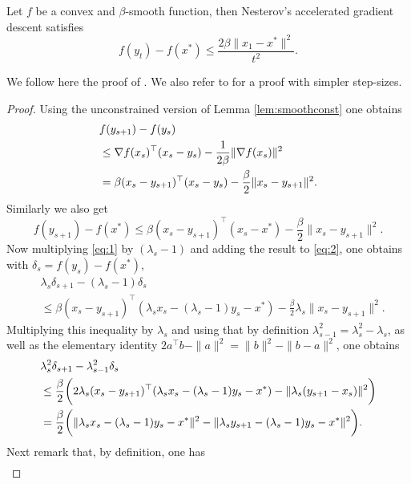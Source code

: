 \documentclass[openany]{now}
\begin{document}
\begin{theorem}
Let $f$ be a convex and $\beta$-smooth function, then Nesterov's accelerated gradient descent satisfies
$$f(y_t) - f(x^*) \leq \frac{2 \beta \|x_1 - x^*\|^2}{t^2} .$$
\end{theorem}

We follow here the proof of \cite{BT09}. We also refer to \cite{Tse08} for a proof with simpler step-sizes.

\begin{proof}
Using the unconstrained version of Lemma \ref{lem:smoothconst} one obtains
\begin{align}
& f(y_{s+1}) - f(y_s) \notag \\
& \leq \nabla f(x_s)^{\top} (x_s-y_s) - \frac{1}{2 \beta} \| \nabla f(x_s) \|^2 \notag \\
& = \beta (x_s - y_{s+1})^{\top} (x_s-y_s) - \frac{\beta}{2} \| x_s - y_{s+1} \|^2 . \label{eq:1}
\end{align}
Similarly we also get
\begin{equation} \label{eq:2}
f(y_{s+1}) - f(x^*) \leq \beta (x_s - y_{s+1})^{\top} (x_s-x^*) - \frac{\beta}{2} \| x_s - y_{s+1} \|^2 .
\end{equation}
Now multiplying \eqref{eq:1} by $(\lambda_{s}-1)$ and adding the result to \eqref{eq:2}, one obtains with $\delta_s = f(y_s) - f(x^*)$,
\begin{align*}
& \lambda_{s} \delta_{s+1} - (\lambda_{s} - 1) \delta_s \\
& \leq \beta (x_s - y_{s+1})^{\top} (\lambda_{s} x_{s} - (\lambda_{s} - 1) y_s-x^*) - \frac{\beta}{2} \lambda_{s} \| x_s - y_{s+1} \|^2.
\end{align*}
Multiplying this inequality by $\lambda_{s}$ and using that by definition $\lambda_{s-1}^2 = \lambda_{s}^2 - \lambda_{s}$, as well as the elementary identity $2 a^{\top} b -  \|a\|^2 = \|b\|^2 - \|b-a\|^2$, one obtains
\begin{align}
& \lambda_{s}^2 \delta_{s+1} - \lambda_{s-1}^2 \delta_s \notag \\
& \leq \frac{\beta}{2} \bigg( 2 \lambda_{s} (x_s - y_{s+1})^{\top} (\lambda_{s} x_{s} - (\lambda_{s} - 1) y_s-x^*) - \|\lambda_{s}( y_{s+1} - x_s  )\|^2\bigg) \notag \\
& = \frac{\beta}{2} \bigg(\| \lambda_{s} x_{s} - (\lambda_{s} - 1) y_{s}-x^* \|^2 - \| \lambda_{s} y_{s+1} - (\lambda_{s} - 1) y_{s}-x^* \|^2 \bigg). \label{eq:3}
\end{align}
Next remark that, by definition, one has 
\begin{align}

\end{align}
\end{proof}
\end{document}
